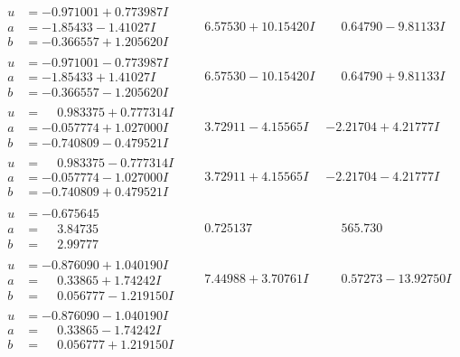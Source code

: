 \documentclass[1p]{elsarticle_modified}
\theoremstyle{definition}
\begin{document}
$$\begin{array}{c|c|c}
\begin{aligned}
u &= -0.971001 + 0.773987 I \\
a &= -1.85433 - 1.41027 I \\
b &= -0.366557 + 1.205620 I\end{aligned}
 & \phantom{-}6.57530 + 10.15420 I & \phantom{-}0.64790 - 9.81133 I \\ \hline\begin{aligned}
u &= -0.971001 - 0.773987 I \\
a &= -1.85433 + 1.41027 I \\
b &= -0.366557 - 1.205620 I\end{aligned}
 & \phantom{-}6.57530 - 10.15420 I & \phantom{-}0.64790 + 9.81133 I \\ \hline\begin{aligned}
u &= \phantom{-}0.983375 + 0.777314 I \\
a &= -0.057774 + 1.027000 I \\
b &= -0.740809 - 0.479521 I\end{aligned}
 & \phantom{-}3.72911 - 4.15565 I & -2.21704 + 4.21777 I \\ \hline\begin{aligned}
u &= \phantom{-}0.983375 - 0.777314 I \\
a &= -0.057774 - 1.027000 I \\
b &= -0.740809 + 0.479521 I\end{aligned}
 & \phantom{-}3.72911 + 4.15565 I & -2.21704 - 4.21777 I \\ \hline\begin{aligned}
u &= -0.675645\phantom{ +0.000000I} \\
a &= \phantom{-}3.84735\phantom{ +0.000000I} \\
b &= \phantom{-}2.99777\phantom{ +0.000000I}\end{aligned}
 & \phantom{-}0.725137\phantom{ +0.000000I} & \phantom{-}565.730\phantom{ +0.000000I} \\ \hline\begin{aligned}
u &= -0.876090 + 1.040190 I \\
a &= \phantom{-}0.33865 + 1.74242 I \\
b &= \phantom{-}0.056777 - 1.219150 I\end{aligned}
 & \phantom{-}7.44988 + 3.70761 I & \phantom{-}0.57273 - 13.92750 I \\ \hline\begin{aligned}
u &= -0.876090 - 1.040190 I \\
a &= \phantom{-}0.33865 - 1.74242 I \\
b &= \phantom{-}0.056777 + 1.219150 I\end{aligned}

\end{array}$$
\end{document}
